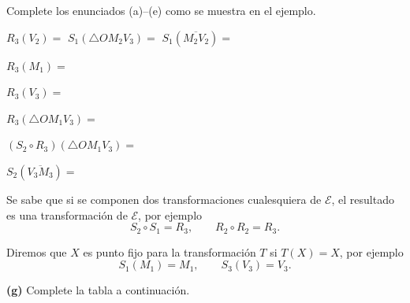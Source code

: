 \documentclass[11pt]{article}
\newcommand{\ptsbox}[1]{\fboxsep=3pt\fbox{\footnotesize #1}\hspace{4pt}}
\begin{document}
\begin{enumerate}
\vspace{4pt}
Complete los enunciados (a)--(e) como se muestra en el ejemplo.

\vspace{4pt}
\noindent $R_3(V_2) = $ \underline{\hspace{1.3cm}} \hfill $S_1(\triangle OM_2V_3) = $ \underline{\hspace{2.2cm}} \hfill $S_1(\overline{M_2V_2}) = $ \underline{\hspace{2cm}}

\vspace{10pt}
\begin{minipage}[t]{0.47\linewidth}
\begin{opciones}
\item \ptsbox{2pt} $R_3(M_1) = $ \underline{\hspace{2.5cm}}
\item \ptsbox{2pt} $R_3(V_3) = $ \underline{\hspace{2.5cm}}
\item \ptsbox{2pt} $R_3(\triangle OM_1V_3) = $ \underline{\hspace{2.5cm}}
\end{opciones}
\end{minipage}%
\hfill
\begin{minipage}[t]{0.47\linewidth}
\begin{opciones}
\setcounter{opcionesi}{3}
\item \ptsbox{3pt} $(S_2\circ R_3)(\triangle OM_1V_3) = $ \underline{\hspace{2cm}}
\item \ptsbox{2pt} $S_2(\overline{V_3M_3}) = $ \underline{\hspace{2.5cm}}
\end{opciones}
\end{minipage}

\vspace{10pt}
Se sabe que si se componen dos transformaciones cualesquiera de $\mathcal{E}$, el resultado es una transformación de $\mathcal{E}$, por ejemplo
\[
S_2\circ S_1 = R_3, \qquad R_2\circ R_2 = R_3.
\]

\vspace{4pt}
Diremos que $X$ es punto fijo para la transformación $T$ si $T(X) = X$, por ejemplo
\[
S_1(M_1) = M_1, \qquad S_3(V_3) = V_3.
\]

\vspace{10pt}
\begin{minipage}[t]{0.47\linewidth}
\ptsbox{10pt} \textbf{(g)} Complete la tabla a continuación.


\end{minipage}
\end{enumerate}
\end{document}
